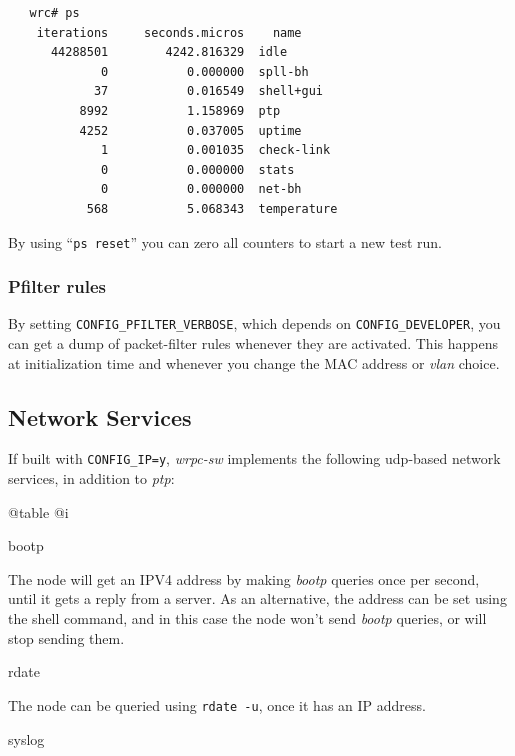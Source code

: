 \documentclass[a4paper, 12pt]{article}
\begin{document}
\begin{lstlisting}
   wrc# ps
    iterations     seconds.micros    name
      44288501        4242.816329  idle
             0           0.000000  spll-bh
            37           0.016549  shell+gui
          8992           1.158969  ptp
          4252           0.037005  uptime
             1           0.001035  check-link
             0           0.000000  stats
             0           0.000000  net-bh
           568           5.068343  temperature
\end{lstlisting}

By using ``\texttt{ps reset}'' you can zero all counters to start a new
test run.

\label{Pfilter rules}
\subsubsection{Pfilter rules}

By setting \texttt{CONFIG\_PFILTER\_VERBOSE}, which depends on
\texttt{CONFIG\_DEVELOPER}, you can get a dump of packet-filter rules
whenever they are activated.  This happens at initialization time and
whenever you change the MAC address or \textit{vlan} choice.

\label{Network Services}
\subsection{Network Services}

If built with \texttt{CONFIG\_IP=y}, \textit{wrpc-sw} implements the following
udp-based network services, in addition to \textit{ptp}:

@table @i

\item bootp

	The node will get an IPV4 address by making \textit{bootp} queries
        once per second, until it gets a reply from a server. As an
        alternative, the address can be set using the shell command,
        and in this case the node won't send \textit{bootp} queries, or will
        stop sending them.

\item rdate

	The node can be queried using \texttt{rdate -u}, once it has an IP
        address.

\item syslog
\end{document}
